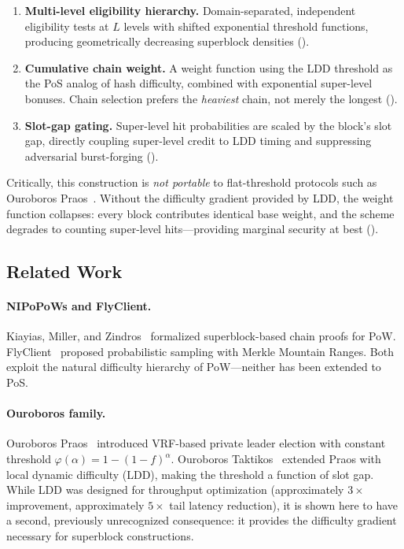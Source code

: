 \documentclass[11pt]{article}
\newcommand{\stake}{\alpha}
\newcommand{\threshold}{\varphi}
\begin{document}
\begin{enumerate}
    \item \textbf{Multi-level eligibility hierarchy.} Domain-separated, independent eligibility tests at $L$ levels with shifted exponential threshold functions, producing geometrically decreasing superblock densities ().
    \item \textbf{Cumulative chain weight.} A weight function using the LDD threshold as the PoS analog of hash difficulty, combined with exponential super-level bonuses. Chain selection prefers the \emph{heaviest} chain, not merely the longest ().
    \item \textbf{Slot-gap gating.} Super-level hit probabilities are scaled by the block's slot gap, directly coupling super-level credit to LDD timing and suppressing adversarial burst-forging ().
\end{enumerate}

Critically, this construction is \emph{not portable} to flat-threshold protocols such as Ouroboros Praos~\cite{praos}. Without the difficulty gradient provided by LDD, the weight function collapses: every block contributes identical base weight, and the scheme degrades to counting super-level hits---providing marginal security at best ().

\subsection{Related Work}

\paragraph{NIPoPoWs and FlyClient.} Kiayias, Miller, and Zindros~\cite{nipopows} formalized superblock-based chain proofs for PoW. FlyClient~\cite{flyclient} proposed probabilistic sampling with Merkle Mountain Ranges. Both exploit the natural difficulty hierarchy of PoW---neither has been extended to PoS.

\paragraph{Ouroboros family.} Ouroboros Praos~\cite{praos} introduced VRF-based private leader election with constant threshold $\threshold(\stake) = 1 - (1 - f)^\stake$. Ouroboros Taktikos~\cite{taktikos} extended Praos with local dynamic difficulty (LDD), making the threshold a function of slot gap. While LDD was designed for throughput optimization (approximately $3\times$ improvement, approximately $5\times$ tail latency reduction), it is shown here to have a second, previously unrecognized consequence: it provides the difficulty gradient necessary for superblock constructions.
\end{document}
